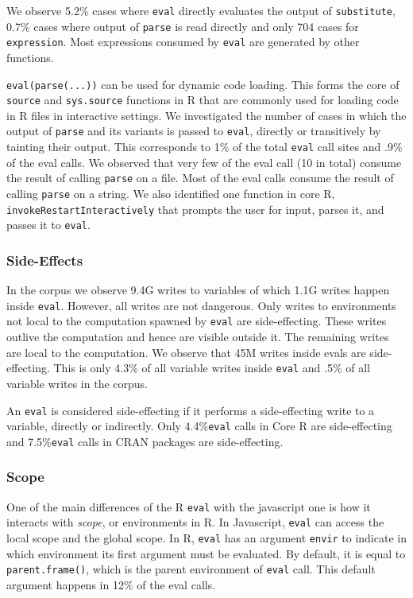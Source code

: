 \documentclass[USenglish,cleveref, autoref, thm-restate]{lipics-v2019}
\newcommand{\AllWritesRnd}{9.4G\xspace}
\newcommand{\EvalWritesRnd}{1.1G\xspace}
\newcommand{\EvalSideEffectingWritesRnd}{45M\xspace}
\newcommand{\EvalSideEffectingWritesEvalPerc}{4.3\%\xspace}
\newcommand{\EvalSideEffectingWritesAllPerc}{.5\%\xspace}
\newcommand{\SideEffectingCoreCallPerc}{4.4\%\xspace}
\newcommand{\SideEffectingPackageCallPerc}{7.5\%\xspace}
\newcommand{\DefaultEnvirExprPercent}{12\%\xspace}
\newcommand{\PercentParsedEvals}{.9\%\xspace}
\newcommand{\PercentParsedCallSites}{1\%\xspace}
\newcommand{\NbParseFilesRnd}{10\xspace}
\newcommand{\eval}{\texttt{eval}\xspace}
\renewcommand{\c}[1]{\lstinline{#1}\xspace}
\begin{document}
We observe 5.2\% cases where \eval directly evaluates the output of
\c{substitute}, 0.7\% cases where output of \c{parse} is read directly and
only 704 cases for \c{expression}. Most expressions consumed by \eval are
generated by other functions.

\c{eval(parse(...))} can be used for dynamic code loading. This forms the
core of \c{source} and \c{sys.source} functions in R that are commonly used
for loading code in R files in interactive settings. We investigated the
number of cases in which the output of \c{parse} and its variants is passed
to \eval, directly or transitively by tainting their output. This
corresponds to \PercentParsedCallSites of the total \eval call sites and
\PercentParsedEvals of the eval calls. We observed that very few of the eval
call (\NbParseFilesRnd in total) consume the result of calling \c{parse} on
a file. Most of the eval calls consume the result of calling \c{parse} on a
string.  We also identified one function in core R,
\c{invokeRestartInteractively} that prompts the user for input, parses it,
and passes it to \eval.

\subsubsection{Side-Effects}

In the corpus we observe \AllWritesRnd writes to variables of which
\EvalWritesRnd writes happen inside \eval. However, all writes are not
dangerous. Only writes to environments not local to the computation spawned
by \eval are side-effecting. These writes outlive the computation and hence
are visible outside it. The remaining writes are local to the
computation. We observe that \EvalSideEffectingWritesRnd writes inside evals
are side-effecting. This is only \EvalSideEffectingWritesEvalPerc of all
variable writes inside \eval and \EvalSideEffectingWritesAllPerc of all
variable writes in the corpus.

An \eval is considered side-effecting if it performs a side-effecting write to a
variable, directly or indirectly. Only \SideEffectingCoreCallPerc \eval calls in
Core R are side-effecting and \SideEffectingPackageCallPerc \eval calls in CRAN
packages are side-effecting.

\subsubsection{Scope}

One of the main differences of the R \eval with the javascript one is how it
interacts with \emph{scope}, or environments in R. In Javascript, \eval can
access the local scope and the global scope. In R, \eval has an argument
\c{envir} to indicate in which environment its first argument must be evaluated.
By default, it is equal to \c{parent.frame()}, 
which is the parent environment of \eval call. This default argument
happens in \DefaultEnvirExprPercent of the eval calls.
\end{document}
